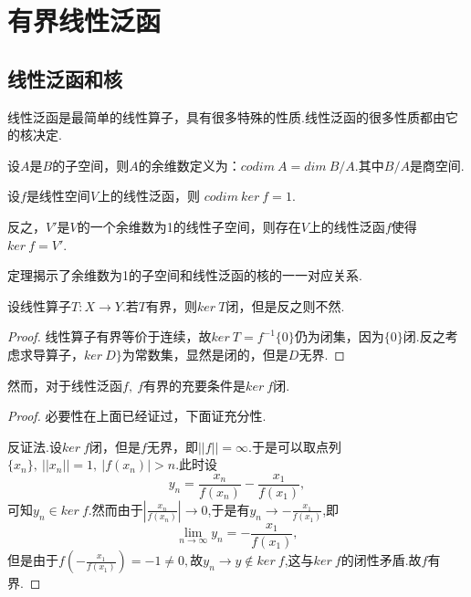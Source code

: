 \documentclass[lang=cn,10pt]{elegantbook}
\begin{document}
	\section{有界线性泛函}
	\subsection{线性泛函和核}
	线性泛函是最简单的线性算子，具有很多特殊的性质.线性泛函的很多性质都由它的核决定.
	
	设\(A\)是\(B\)的子空间，则\(A\)的余维数定义为：\(codim\ A=dim\ B/A\).其中\(B/A\)是商空间.
	\begin{theorem}[线性泛函和核的余维数(2.2.0)]
		设\(f\)是线性空间\(V\)上的线性泛函，则 \(codim\ ker\ f=1.\)
		
		反之，\(V'\)是\(V\)的一个余维数为1的线性子空间，则存在\(V\)上的线性泛函\(f\)使得\(ker\ f=V'\).
	\end{theorem}
	\begin{note}
		定理揭示了余维数为1的子空间和线性泛函的核的一一对应关系.
	\end{note}
	\begin{theorem}[具有闭核的线性泛函有界]
		设线性算子\(T:X\to Y.\)若\(T\)有界，则\(ker\ T\)闭，但是反之则不然.
		\begin{proof}
			线性算子有界等价于连续，故\(ker\ T=f^{-1}\{0\}\)仍为闭集，因为\(\{0\}\)闭.反之考虑求导算子，\(ker\ D\}\)为常数集，显然是闭的，但是\(D\)无界.
		\end{proof}
		然而，对于线性泛函\(f,\ f\)有界的充要条件是\(ker\ f\)闭.
	\end{theorem}
	\begin{proof}
		必要性在上面已经证过，下面证充分性.
		
		反证法.设\(ker\ f\)闭，但是\(f\)无界，即\(||f||=\infty.\)于是可以取点列\(\{x_n\},\ ||x_n||=1,\ |f(x_n)|>n.\)此时设
		\[y_n=\frac{x_n}{f(x_n)}-\frac{x_1}{f(x_1)},\]
		可知\(y_n\in ker\ f\).然而由于\(|\frac{x_n}{f(x_n)}|\to 0\),于是有\(y_n\to -\frac{x_1}{f(x_1)}\),即
		\[\lim_{n\to \infty}y_n=-\frac{x_1}{f(x_1)},\]
		但是由于\(f(-\frac{x_1}{f(x_1)})=-1\ne 0,\)故\(y_n\to y\notin ker\ f\),这与\(ker\ f\)的闭性矛盾.故\(f\)有界.
	\end{proof}
	
\end{document}
